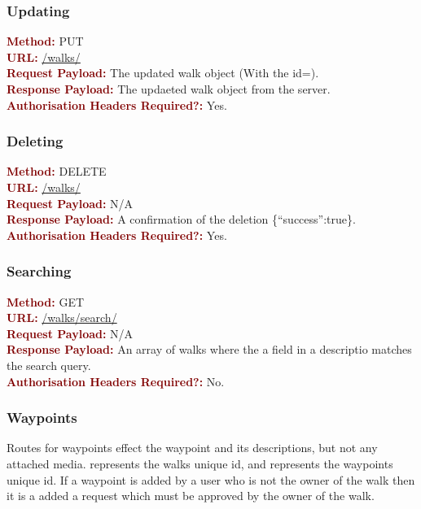 \documentclass[11pt,a4paper]{report}
\begin{document}
\subsubsection{Updating}
\textbf{\textcolor{Maroon}{Method:}} PUT\\
\textbf{\textcolor{Maroon}{URL:}} \url{/walks/}\\
\textbf{\textcolor{Maroon}{Request Payload:}} The updated walk object (With the id=).\\
\textbf{\textcolor{Maroon}{Response Payload:}} The updaeted walk object from the server.\\
\textbf{\textcolor{Maroon}{Authorisation Headers Required?:}} Yes.

\subsubsection{Deleting}
\textbf{\textcolor{Maroon}{Method:}} DELETE\\
\textbf{\textcolor{Maroon}{URL:}} \url{/walks/}\\
\textbf{\textcolor{Maroon}{Request Payload:}} N/A\\
\textbf{\textcolor{Maroon}{Response Payload:}} A confirmation of the deletion \{``success'':true\}.\\
\textbf{\textcolor{Maroon}{Authorisation Headers Required?:}} Yes.

\subsubsection{Searching}
\textbf{\textcolor{Maroon}{Method:}} GET\\
\textbf{\textcolor{Maroon}{URL:}} \url{/walks/search/}\\
\textbf{\textcolor{Maroon}{Request Payload:}} N/A\\
\textbf{\textcolor{Maroon}{Response Payload:}} An array of walks where the a field in a descriptio matches the search query.\\
\textbf{\textcolor{Maroon}{Authorisation Headers Required?:}} No.

\subsubsection{Waypoints}

Routes for waypoints effect the waypoint and its descriptions, but not any attached media.  represents the walks unique id, and  represents the waypoints unique id. If a waypoint is added by a user who is not the owner of the walk then it is a added a request which must be approved by the owner of the walk.
\end{document}
